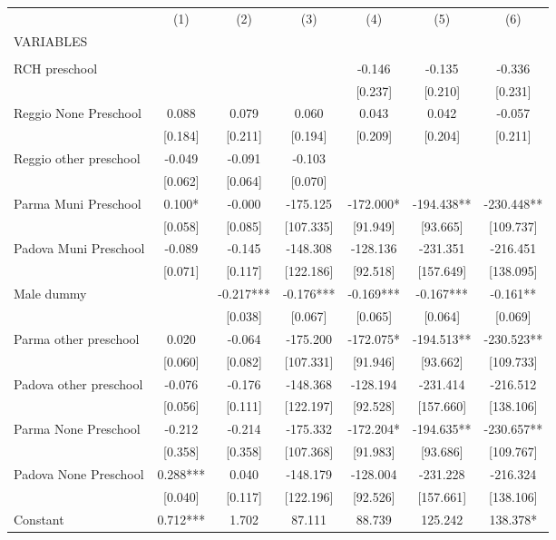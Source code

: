 \begin{tabular}{lcccccc} \hline
 & (1) & (2) & (3) & (4) & (5) & (6) \\
VARIABLES &  &  &  &  &  &  \\ \hline
 &  &  &  &  &  &  \\
RCH preschool &  &  &  & -0.146 & -0.135 & -0.336 \\
 &  &  &  & [0.237] & [0.210] & [0.231] \\
Reggio None Preschool & 0.088 & 0.079 & 0.060 & 0.043 & 0.042 & -0.057 \\
 & [0.184] & [0.211] & [0.194] & [0.209] & [0.204] & [0.211] \\
Reggio other preschool & -0.049 & -0.091 & -0.103 &  &  &  \\
 & [0.062] & [0.064] & [0.070] &  &  &  \\
Parma Muni Preschool & 0.100* & -0.000 & -175.125 & -172.000* & -194.438** & -230.448** \\
 & [0.058] & [0.085] & [107.335] & [91.949] & [93.665] & [109.737] \\
Padova Muni Preschool & -0.089 & -0.145 & -148.308 & -128.136 & -231.351 & -216.451 \\
 & [0.071] & [0.117] & [122.186] & [92.518] & [157.649] & [138.095] \\
Male dummy &  & -0.217*** & -0.176*** & -0.169*** & -0.167*** & -0.161** \\
 &  & [0.038] & [0.067] & [0.065] & [0.064] & [0.069] \\
Parma other preschool & 0.020 & -0.064 & -175.200 & -172.075* & -194.513** & -230.523** \\
 & [0.060] & [0.082] & [107.331] & [91.946] & [93.662] & [109.733] \\
Padova other preschool & -0.076 & -0.176 & -148.368 & -128.194 & -231.414 & -216.512 \\
 & [0.056] & [0.111] & [122.197] & [92.528] & [157.660] & [138.106] \\
Parma None Preschool & -0.212 & -0.214 & -175.332 & -172.204* & -194.635** & -230.657** \\
 & [0.358] & [0.358] & [107.368] & [91.983] & [93.686] & [109.767] \\
Padova None Preschool & 0.288*** & 0.040 & -148.179 & -128.004 & -231.228 & -216.324 \\
 & [0.040] & [0.117] & [122.196] & [92.526] & [157.661] & [138.106] \\
Constant & 0.712*** & 1.702 & 87.111 & 88.739 & 125.242 & 138.378* \\

\end{tabular}
